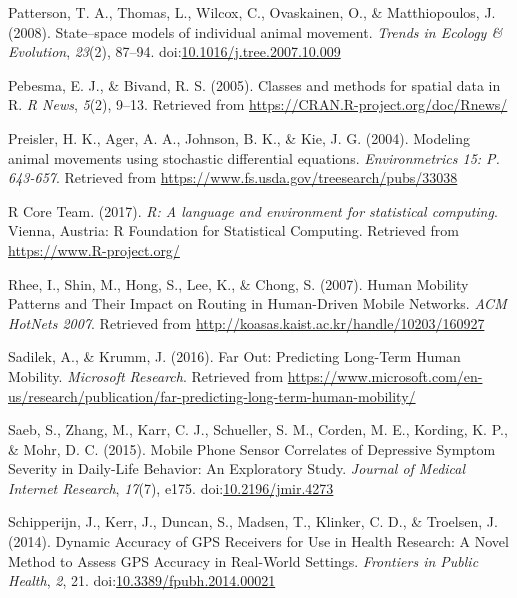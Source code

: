 \documentclass[english,man]{apa6}
\theoremstyle{definition}
\theoremstyle{definition}
\theoremstyle{definition}
\theoremstyle{remark}
\begin{document}
\hypertarget{ref-patterson_statespace_2008}{}
Patterson, T. A., Thomas, L., Wilcox, C., Ovaskainen, O., \&
Matthiopoulos, J. (2008). State--space models of individual animal
movement. \emph{Trends in Ecology \& Evolution}, \emph{23}(2), 87--94.
doi:\href{https://doi.org/10.1016/j.tree.2007.10.009}{10.1016/j.tree.2007.10.009}

\hypertarget{ref-sp1}{}
Pebesma, E. J., \& Bivand, R. S. (2005). Classes and methods for spatial
data in R. \emph{R News}, \emph{5}(2), 9--13. Retrieved from
\url{https://CRAN.R-project.org/doc/Rnews/}

\hypertarget{ref-preisler_modeling_2004}{}
Preisler, H. K., Ager, A. A., Johnson, B. K., \& Kie, J. G. (2004).
Modeling animal movements using stochastic differential equations.
\emph{Environmetrics 15: P. 643-657}. Retrieved from
\url{https://www.fs.usda.gov/treesearch/pubs/33038}

\hypertarget{ref-base}{}
R Core Team. (2017). \emph{R: A language and environment for statistical
computing}. Vienna, Austria: R Foundation for Statistical Computing.
Retrieved from \url{https://www.R-project.org/}

\hypertarget{ref-rhee_human_2007}{}
Rhee, I., Shin, M., Hong, S., Lee, K., \& Chong, S. (2007). Human
Mobility Patterns and Their Impact on Routing in Human-Driven Mobile
Networks. \emph{ACM HotNets 2007}. Retrieved from
\url{http://koasas.kaist.ac.kr/handle/10203/160927}

\hypertarget{ref-sadilek_far_2016}{}
Sadilek, A., \& Krumm, J. (2016). Far Out: Predicting Long-Term Human
Mobility. \emph{Microsoft Research}. Retrieved from
\url{https://www.microsoft.com/en-us/research/publication/far-predicting-long-term-human-mobility/}

\hypertarget{ref-saeb_mobile_2015}{}
Saeb, S., Zhang, M., Karr, C. J., Schueller, S. M., Corden, M. E.,
Kording, K. P., \& Mohr, D. C. (2015). Mobile Phone Sensor Correlates of
Depressive Symptom Severity in Daily-Life Behavior: An Exploratory
Study. \emph{Journal of Medical Internet Research}, \emph{17}(7), e175.
doi:\href{https://doi.org/10.2196/jmir.4273}{10.2196/jmir.4273}

\hypertarget{ref-schipperijn_dynamic_2014}{}
Schipperijn, J., Kerr, J., Duncan, S., Madsen, T., Klinker, C. D., \&
Troelsen, J. (2014). Dynamic Accuracy of GPS Receivers for Use in Health
Research: A Novel Method to Assess GPS Accuracy in Real-World Settings.
\emph{Frontiers in Public Health}, \emph{2}, 21.
doi:\href{https://doi.org/10.3389/fpubh.2014.00021}{10.3389/fpubh.2014.00021}
\end{document}
